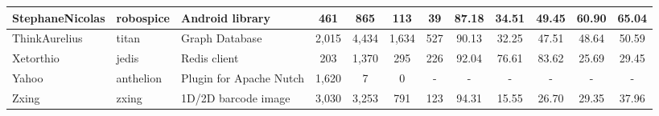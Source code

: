 \begin{landscape}
\begin{table}
\begin{tabular}{lllccccccccc}
StephaneNicolas             & robospice                                                     & Android library                                                          & 461             & 865              & 113                                                              & 39             & 87.18          & 34.51          & 49.45          & 60.90                                                             & 65.04                                                              \\ \hline
ThinkAurelius               & titan                                                         & Graph Database                                                           & 2,015           & 4,434             & 1,634                                                            & 527            & 90.13          & 32.25          & 47.51          & 48.64                                                             & 50.59                                                              \\ \hline
Xetorthio                   & jedis                                                         & Redis client                                                             & 203             & 1,370             & 295                                                              & 226            & 92.04          & 76.61          & 83.62          & 25.69                                                             & 29.45                                                              \\ \hline
Yahoo                       & anthelion                                                     & Plugin for Apache Nutch                                                  & 1,620            & 7                & 0                                                                & -              & -              & -              & -              & -                                                                 & -                                                                  \\ \hline
Zxing                       & zxing                                                         & 1D/2D barcode image                                                      & 3,030           & 3,253            & 791                                                              & 123            & 94.31          & 15.55          & 26.70          & 29.35                                                             & 37.96                                                              \\ \hline

\end{tabular}
\end{table}
\end{landscape}
